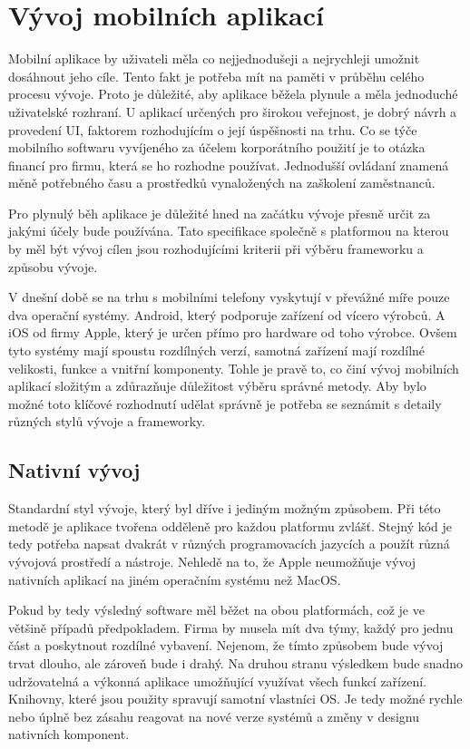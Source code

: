 \documentclass[
  biblatex,
  glossaries,
  index
]{kidiplom}
\begin{document}
\section{Vývoj mobilních aplikací}
Mobilní aplikace by uživateli měla co nejjednodušeji a nejrychleji umožnit dosáhnout jeho cíle. Tento fakt je potřeba mít na paměti v průběhu celého procesu vývoje. Proto je důležité, aby aplikace běžela plynule a měla jednoduché uživatelské rozhraní. U aplikací určených pro širokou veřejnost, je dobrý návrh a provedení UI, faktorem rozhodujícím o její úspěšnosti na trhu. Co se týče mobilního softwaru vyvíjeného za účelem korporátního použití je to otázka financí pro firmu, která se ho rozhodne používat. Jednodušší ovládaní znamená měně potřebného času a prostředků vynaložených na zaškolení zaměstnanců.

Pro plynulý běh aplikace je důležité hned na začátku vývoje přesně určit za jakými účely bude používána. Tato specifikace společně s platformou na kterou by měl být vývoj cílen jsou rozhodujícími kriterii při výběru frameworku a způsobu vývoje.

V dnešní době se na trhu s mobilními telefony vyskytují v převážné míře pouze dva operační systémy. Android, který podporuje zařízení od vícero výrobců. A iOS od firmy Apple, který je určen přímo pro hardware od toho výrobce. Ovšem tyto systémy mají spoustu rozdílných verzí, samotná zařízení mají rozdílné velikosti, funkce a vnitřní komponenty. Tohle je pravě to, co činí vývoj mobilních aplikací složitým a zdůrazňuje důležitost výběru správné metody. Aby bylo možné toto klíčové rozhodnutí udělat správně je potřeba se seznámit s detaily různých stylů vývoje a frameworky.

\subsection{Nativní vývoj}
Standardní styl vývoje, který byl dříve i jediným možným způsobem. Při této metodě je aplikace tvořena odděleně pro každou platformu zvlášť. Stejný kód je tedy potřeba napsat dvakrát v různých programovacích jazycích a použít různá vývojová prostředí a nástroje. Nehledě na to, že Apple neumožňuje vývoj nativních aplikací na jiném operačním systému než MacOS. 

Pokud by tedy výsledný software měl běžet na obou platformách, což je ve většině případů předpokladem. Firma by musela mít dva týmy, každý pro jednu část a poskytnout rozdílné vybavení. Nejenom, že tímto způsobem bude vývoj trvat dlouho, ale zároveň bude i drahý. Na druhou stranu výsledkem bude snadno udržovatelná a výkonná aplikace umožňující využívat všech funkcí zařízení. Knihovny, které jsou použity spravují samotní vlastníci OS. Je tedy možné rychle nebo úplně bez zásahu reagovat na nové verze systémů a změny v designu nativních komponent. 
\end{document}
